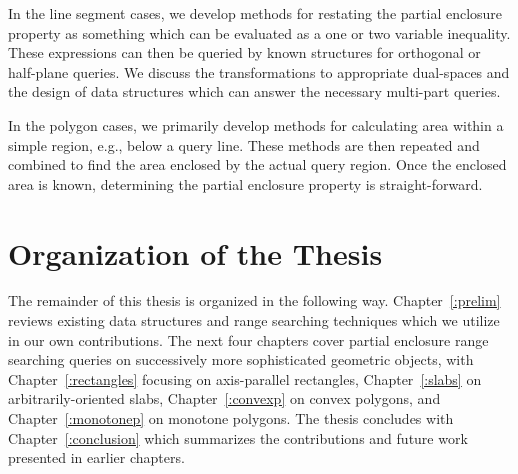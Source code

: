 In the line segment cases, we develop methods for restating the partial enclosure property as something which can be evaluated as a one or two variable inequality. 
These expressions can then be queried by known structures for orthogonal or half-plane queries. 
We discuss the transformations to appropriate dual-spaces and the design of data structures which can answer the necessary multi-part queries.

In the polygon cases, we primarily develop methods for calculating area within a simple region, e.g., below a query line.
These methods are then repeated and combined to find the area enclosed by the actual query region.
Once the enclosed area is known, determining the partial enclosure property is straight-forward.

\section{Organization of the Thesis}
\label{:intro:organization}

The remainder of this thesis is organized in the following way. 
Chapter~\ref{:prelim} reviews existing data structures and range searching techniques which we utilize in our own contributions.
The next four chapters cover partial enclosure range searching queries on successively more sophisticated geometric objects, with Chapter~\ref{:rectangles} focusing on axis-parallel rectangles, Chapter~\ref{:slabs} on arbitrarily-oriented slabs, Chapter~\ref{:convexp} on convex polygons, and Chapter~\ref{:monotonep} on monotone polygons.
The thesis concludes with Chapter~\ref{:conclusion} which summarizes the contributions and future work presented in earlier chapters.
